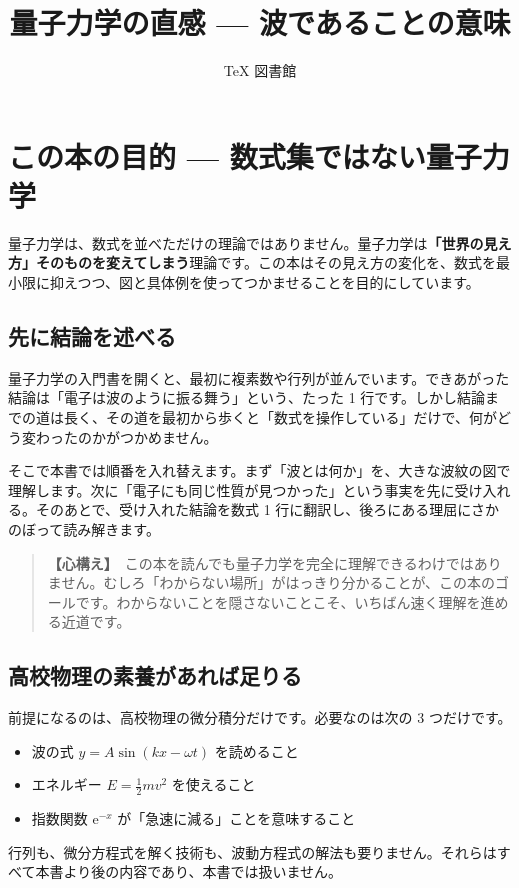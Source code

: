 \documentclass{article}
\title{量子力学の直感 — 波であることの意味}
\author{TeX 図書館}
\begin{document}
\section{この本の目的 — 数式集ではない量子力学}

量子力学は、数式を並べただけの理論ではありません。量子力学は\textbf{「世界の見え方」そのものを変えてしまう}理論です。この本はその見え方の変化を、数式を最小限に抑えつつ、図と具体例を使ってつかませることを目的にしています。

\subsection{先に結論を述べる}

量子力学の入門書を開くと、最初に複素数や行列が並んでいます。できあがった結論は「電子は波のように振る舞う」という、たった 1 行です。しかし結論までの道は長く、その道を最初から歩くと「数式を操作している」だけで、何がどう変わったのかがつかめません。

そこで本書では順番を入れ替えます。まず「波とは何か」を、大きな波紋の図で理解します。次に「電子にも同じ性質が見つかった」という事実を先に受け入れる。そのあとで、受け入れた結論を数式 1 行に翻訳し、後ろにある理屈にさかのぼって読み解きます。

\begin{quote}
\textbf{【心構え】}\ この本を読んでも量子力学を完全に理解できるわけではありません。むしろ「わからない場所」がはっきり分かることが、この本のゴールです。わからないことを隠さないことこそ、いちばん速く理解を進める近道です。
\end{quote}

\subsection{高校物理の素養があれば足りる}

前提になるのは、高校物理の微分積分だけです。必要なのは次の 3 つだけです。
\begin{itemize}
\item 波の式 \( y = A \sin(kx - \omega t) \) を読めること
\item エネルギー \( E = \frac{1}{2} m v^2 \) を使えること
\item 指数関数 \(\mathrm{e}^{-x} \) が「急速に減る」ことを意味すること
\end{itemize}

行列も、微分方程式を解く技術も、波動方程式の解法も要りません。それらはすべて本書より後の内容であり、本書では扱いません。
\end{document}
